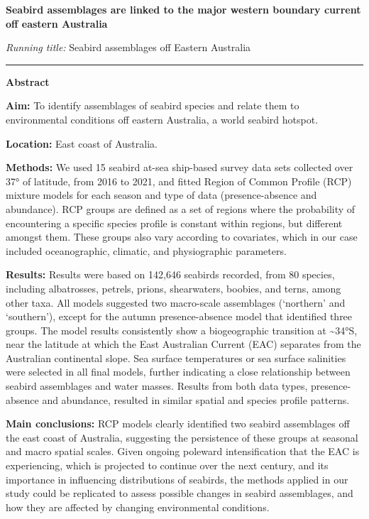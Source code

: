 \documentclass{article}
\begin{document}
\begin{linenumbers}

\begin{center}
\textbf{Seabird assemblages are linked to the major western boundary current off eastern Australia}
\end{center}

\emph{Running title:} Seabird assemblages off Eastern Australia

\begin{center}\rule{0.5\linewidth}{0.5pt}\end{center}

\textbf{Abstract}

\textbf{Aim:} To identify assemblages of seabird species and relate them to environmental conditions off eastern Australia, a world seabird hotspot.

\textbf{Location:} East coast of Australia.

\textbf{Methods:} We used 15 seabird at-sea ship-based survey data sets collected over 37° of latitude, from 2016 to 2021, and fitted Region of Common Profile (RCP) mixture models for each season and type of data (presence-absence and abundance). RCP groups are defined as a set of regions where the probability of encountering a specific species profile is constant within regions, but different amongst them. These groups also vary according to covariates, which in our case included oceanographic, climatic, and physiographic parameters.

\textbf{Results:} Results were based on 142,646 seabirds recorded, from 80 species, including albatrosses, petrels, prions, shearwaters, boobies, and terns, among other taxa. All models suggested two macro-scale assemblages (`northern' and `southern'), except for the autumn presence-absence model that identified three groups. The model results consistently show a biogeographic transition at \textasciitilde34°S, near the latitude at which the East Australian Current (EAC) separates from the Australian continental slope. Sea surface temperatures or sea surface salinities were selected in all final models, further indicating a close relationship between seabird assemblages and water masses. Results from both data types, presence-absence and abundance, resulted in similar spatial and species profile patterns.

\textbf{Main conclusions:} RCP models clearly identified two seabird assemblages off the east coast of Australia, suggesting the persistence of these groups at seasonal and macro spatial scales. Given ongoing poleward intensification that the EAC is experiencing, which is projected to continue over the next century, and its importance in influencing distributions of seabirds, the methods applied in our study could be replicated to assess possible changes in seabird assemblages, and how they are affected by changing environmental conditions.


\end{linenumbers}
\end{document}

